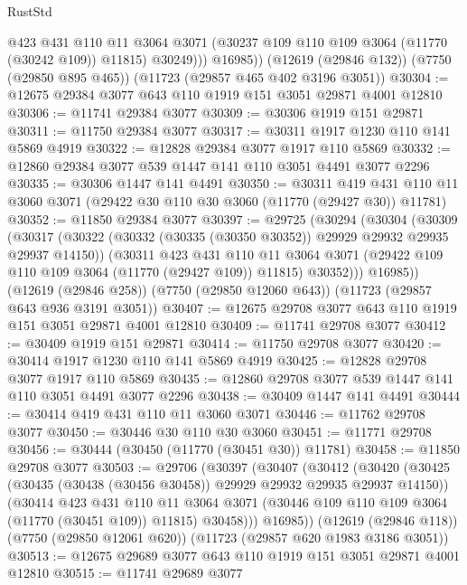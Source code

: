 \begin{lexlean}{RustStd}
\begin{coremodule}
              @423
              @431
              @110
              @11
              @3064
              @3071
              (@30237 @109 @110 @109 @3064 (@11770 (@30242 @109)) @11815)
              @30249)))
        @16985))
    (@12619 (@29846 @132))
    (@7750 (@29850 @895 @465))
    (@11723 (@29857 @465 @402 @3196 @3051))
@30304 := @12675 @29384 @3077 @643 @110 @1919 @151 @3051 @29871 @4001 @12810
@30306 := @11741 @29384 @3077
@30309 := @30306 @1919 @151 @29871
@30311 := @11750 @29384 @3077
@30317 := @30311 @1917 @1230 @110 @141 @5869 @4919
@30322 := @12828 @29384 @3077 @1917 @110 @5869
@30332 := @12860 @29384 @3077 @539 @1447 @141 @110 @3051 @4491 @3077 @2296
@30335 := @30306 @1447 @141 @4491
@30350 := @30311
    @419
    @431
    @110
    @11
    @3060
    @3071
    (@29422 @30 @110 @30 @3060 (@11770 (@29427 @30)) @11781)
@30352 := @11850 @29384 @3077
@30397 := @29725
    (@30294
      (@30304
        (@30309
          (@30317
            (@30322 (@30332 (@30335 (@30350 @30352)) @29929 @29932 @29935 @29937 @14150))
            (@30311
              @423
              @431
              @110
              @11
              @3064
              @3071
              (@29422 @109 @110 @109 @3064 (@11770 (@29427 @109)) @11815)
              @30352)))
        @16985))
    (@12619 (@29846 @258))
    (@7750 (@29850 @12060 @643))
    (@11723 (@29857 @643 @936 @3191 @3051))
@30407 := @12675 @29708 @3077 @643 @110 @1919 @151 @3051 @29871 @4001 @12810
@30409 := @11741 @29708 @3077
@30412 := @30409 @1919 @151 @29871
@30414 := @11750 @29708 @3077
@30420 := @30414 @1917 @1230 @110 @141 @5869 @4919
@30425 := @12828 @29708 @3077 @1917 @110 @5869
@30435 := @12860 @29708 @3077 @539 @1447 @141 @110 @3051 @4491 @3077 @2296
@30438 := @30409 @1447 @141 @4491
@30444 := @30414 @419 @431 @110 @11 @3060 @3071
@30446 := @11762 @29708 @3077
@30450 := @30446 @30 @110 @30 @3060
@30451 := @11771 @29708
@30456 := @30444 (@30450 (@11770 (@30451 @30)) @11781)
@30458 := @11850 @29708 @3077
@30503 := @29706
    (@30397
      (@30407
        (@30412
          (@30420
            (@30425 (@30435 (@30438 (@30456 @30458)) @29929 @29932 @29935 @29937 @14150))
            (@30414
              @423
              @431
              @110
              @11
              @3064
              @3071
              (@30446 @109 @110 @109 @3064 (@11770 (@30451 @109)) @11815)
              @30458)))
        @16985))
    (@12619 (@29846 @118))
    (@7750 (@29850 @12061 @620))
    (@11723 (@29857 @620 @1983 @3186 @3051))
@30513 := @12675 @29689 @3077 @643 @110 @1919 @151 @3051 @29871 @4001 @12810
@30515 := @11741 @29689 @3077

\end{coremodule}
\end{lexlean}
